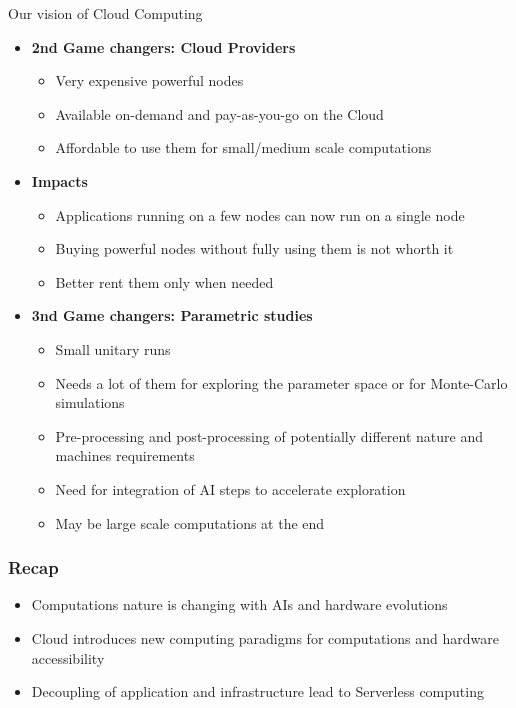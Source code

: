 \documentclass[10pt,aspectratio=1609]{beamer}
\begin{document}
\begin{section}{Our vision of Cloud Computing}
\begin{frame}
\begin{itemize}
    \item \textbf{2nd Game changers: Cloud Providers}
    \begin{itemize}
      \item Very expensive powerful nodes
      \item Available on-demand and pay-as-you-go on the Cloud
      \item Affordable to use them for small/medium scale computations
    \end{itemize}

    \item \textbf{Impacts}
    \begin{itemize}
      \item Applications running on a few nodes can now run on a single node
      \item Buying powerful nodes without fully using them is not whorth it
      \item Better rent them only when needed
    \end{itemize}

    \item \textbf{3nd Game changers: Parametric studies}
    \begin{itemize}
      \item Small unitary runs
      \item Needs a lot of them for exploring the parameter space or for Monte-Carlo simulations
      \item Pre-processing and post-processing of potentially different nature and machines requirements
      \item Need for integration of AI steps to accelerate exploration
      \item May be large scale computations at the end
    \end{itemize}

  \end{itemize}
\end{frame}

\begin{frame}
  \frametitle{Recap}

  \begin{itemize}
    \item Computations nature is changing with AIs and hardware evolutions
    \item Cloud introduces new computing paradigms for computations and hardware accessibility
    \item Decoupling of application and infrastructure lead to Serverless computing

    

  \end{itemize}
\end{frame}


\end{section}
\end{document}
